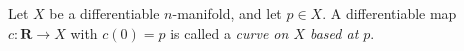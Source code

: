 Let $X$ be a differentiable $n$-manifold, and let $p \in X$. A differentiable map $c \colon \mathbf{R} \to X$ with $c(0) = p$ is called a \emph{curve on $X$ based at $p$}.
